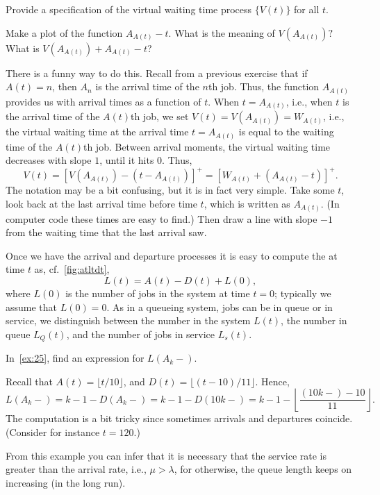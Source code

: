 \begin{exercise}
 Provide a specification of the virtual waiting time process $\{V(t)\}$ for
 all $t$.
\begin{hint}Make a plot of the function $A_{A(t)}-t$. What is the meaning of $V(A_{A(t)})?$ What is
$V(A_{A(t)}) + A_{A(t)}-t$?
\end{hint}
\begin{solution}
 There is a funny way to do this.
 Recall from a previous exercise that if $A(t)=n$, then $A_n$ is the arrival time of the $n$th job.
 Thus, the function $A_{A(t)}$ provides us with arrival times as a function of $t$.
 When $t=A_{A(t)}$, i.e., when $t$ is the arrival time of the $A(t)$th job, we set $V(t) = V(A_{A(t)}) = W_{A(t)}$, i.e., the virtual waiting time at the arrival time $t=A_{A(t)}$ is equal to the waiting time of the $A(t)$th job.
 Between arrival moments, the virtual waiting time decreases with slope $1$, until it hits 0.
 Thus,
 \begin{equation*}
 V(t) 
= [V(A_{A(t)}) - (t-A_{A(t)})]^+= [W_{A(t)} + (A_{A(t)}-t)]^+.
 \end{equation*}
 The notation may be a bit confusing, but it is in fact very simple.
 Take some $t$, look back at the last arrival time before time $t$, which is written as $A_{A(t)}$.
 (In computer code these times are easy to find.)
 Then draw a line with slope $-1$ from the waiting time that the last arrival saw.
\end{solution}
\end{exercise}

Once we have the arrival and departure processes it is easy to compute the  at time $t$ as, cf.~\cref{fig:atltdt},
\begin{equation}\label{eq:14}
 L(t) = A(t) - D(t) + L(0),
\end{equation}
where $L(0)$ is the number of jobs in the system at time $t=0$; typically we assume that $L(0)=0$.
As in a queueing system, jobs can be in queue or in service, we distinguish between the number in the system $L(t)$, the number in queue $L_Q(t)$, and the number of jobs in service $L_s(t)$.

\begin{extra}\label{ex:97}
In~\cref{ex:25},  find an expression for $L(A_k-)$. 
\begin{solution}
Recall that $A(t) = \lfloor t/10\rfloor$, and $D(t) = \lfloor (t-10)/11 \rfloor$.
  Hence,
 \begin{equation*}
 L(A_k-) = k-1 - D(A_k-) = k- 1 - D(10k-) = k- 1 - \left \lfloor \frac{(10k-)-10}{11} \right \rfloor.
 \end{equation*}
 The computation is a bit tricky since sometimes arrivals and departures coincide. (Consider for instance $t=120$.)

From this example you can infer that it is necessary that the service rate is greater than the arrival rate, i.e., $\mu > \lambda$, for otherwise, the queue length keeps on increasing (in the long run).
\end{solution}
\end{extra}

